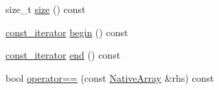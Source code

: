 \begin{DoxyCompactItemize}
size\-\_\-t \hyperlink{classtesting_1_1internal_1_1_native_array_a45de2485baac8bf148e2943828094a40}{size} () const 
\item 
\hyperlink{classtesting_1_1internal_1_1_native_array_a9ce7c8408460d7158a2870456d134557}{const\-\_\-iterator} \hyperlink{classtesting_1_1internal_1_1_native_array_a49c534d29034d9230372ada54ef961bb}{begin} () const 
\item 
\hyperlink{classtesting_1_1internal_1_1_native_array_a9ce7c8408460d7158a2870456d134557}{const\-\_\-iterator} \hyperlink{classtesting_1_1internal_1_1_native_array_a4957ad1ebf7c21eab07d5e0ae2bb17aa}{end} () const 
\item 
bool \hyperlink{classtesting_1_1internal_1_1_native_array_a60af8d9c429771ee131b5ddf7e06e3c9}{operator==} (const \hyperlink{classtesting_1_1internal_1_1_native_array}{Native\-Array} \&rhs) const 
\end{DoxyCompactItemize}


